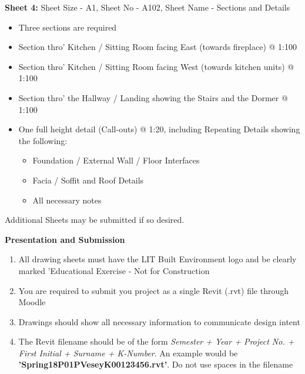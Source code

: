 \textbf{Sheet 4:} Sheet Size - A1, Sheet No - A102, Sheet Name - Sections and Details
\begin{itemize}
	\item Three sections are required
	\item Section thro' Kitchen / Sitting Room facing East (towards fireplace) @ 1:100
	\item Section thro' Kitchen / Sitting Room facing West (towards kitchen units) @ 1:100
	\item Section thro' the Hallway / Landing showing the Stairs and the Dormer @ 1:100
	\item One full height detail (Call-outs) @ 1:20, including Repeating Details showing the following:
	\begin{itemize}
		\item Foundation / External Wall / Floor Interfaces
		\item Facia / Soffit and Roof Details
		\item All necessary notes
	\end{itemize} 
\end{itemize}

Additional Sheets may be submitted if so desired.

\large\textbf{Presentation and Submission}\\
\begin{enumerate}
	\item All drawing sheets must have the LIT Built Environment logo and be clearly marked 'Educational Exercise - Not for Construction
	\item You are required to submit you project as a single Revit (.rvt) file through Moodle
	\item Drawings should show all necessary information to communicate design intent
	\item The Revit filename should be of the form \textit{Semester  + Year + Project No. + First Initial + Surname + K-Number}. An example would be \textbf{'Spring18P01PVeseyK00123456.rvt'}.  Do not use spaces in the filename
\end{enumerate}










